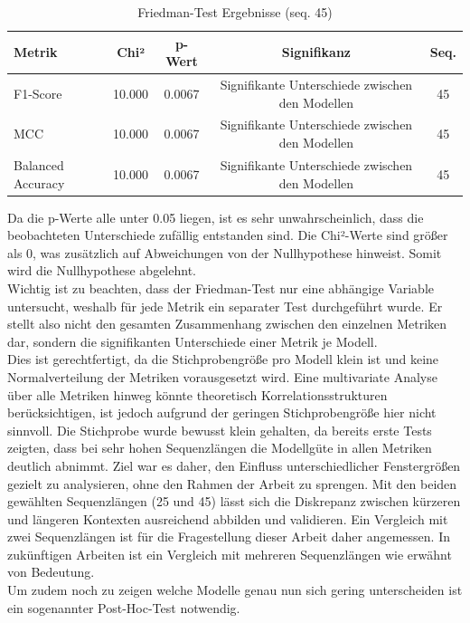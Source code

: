 \documentclass[a4paper,12pt]{article}
\begin{document}
	\begin{table}[H]
		\centering
		\caption{Friedman-Test Ergebnisse (seq. 45)}
		\begin{tabular}{lcccc}
			\toprule
			\textbf{Metrik} & \textbf{Chi²} & \textbf{p-Wert} & \textbf{Signifikanz} & \textbf{Seq.} \\
			\midrule
			F1-Score          & 10.000 & 0.0067 & Signifikante Unterschiede zwischen den Modellen & 45 \\
			MCC               & 10.000 & 0.0067 & Signifikante Unterschiede zwischen den Modellen & 45 \\
			Balanced Accuracy & 10.000 & 0.0067 & Signifikante Unterschiede zwischen den Modellen & 45 \\
			\bottomrule
		\end{tabular}
	\end{table}
	Da die p-Werte alle unter 0.05 liegen, ist es sehr unwahrscheinlich, dass die beobachteten Unterschiede zufällig entstanden sind. Die Chi²-Werte sind größer als 0, was zusätzlich auf Abweichungen von der Nullhypothese hinweist. Somit wird die Nullhypothese abgelehnt.
	\\[0.5em]
	Wichtig ist zu beachten, dass der Friedman-Test nur eine abhängige Variable untersucht, weshalb für jede Metrik ein separater Test durchgeführt wurde. Er stellt also nicht den gesamten Zusammenhang zwischen den einzelnen Metriken dar, sondern die signifikanten Unterschiede einer Metrik je Modell. 
	\\[0.5em]
	Dies ist gerechtfertigt, da die Stichprobengröße pro Modell klein ist und keine Normalverteilung der Metriken vorausgesetzt wird. Eine multivariate Analyse über alle Metriken hinweg könnte theoretisch Korrelationsstrukturen berücksichtigen, ist jedoch aufgrund der geringen Stichprobengröße hier nicht sinnvoll. Die Stichprobe wurde bewusst klein gehalten, da bereits erste Tests zeigten, dass bei sehr hohen Sequenzlängen die Modellgüte in allen Metriken deutlich abnimmt. Ziel war es daher, den Einfluss unterschiedlicher Fenstergrößen gezielt zu analysieren, ohne den Rahmen der Arbeit zu sprengen. Mit den beiden gewählten Sequenzlängen (25 und 45) lässt sich die Diskrepanz zwischen kürzeren und längeren Kontexten ausreichend abbilden und validieren. Ein Vergleich mit zwei Sequenzlängen ist für die Fragestellung dieser Arbeit daher angemessen. In zukünftigen Arbeiten ist ein Vergleich mit mehreren Sequenzlängen wie erwähnt von Bedeutung.
	\\[0.5em]
	Um zudem noch zu zeigen welche Modelle genau nun sich gering unterscheiden ist ein sogenannter Post-Hoc-Test notwendig.
	
\end{document}
